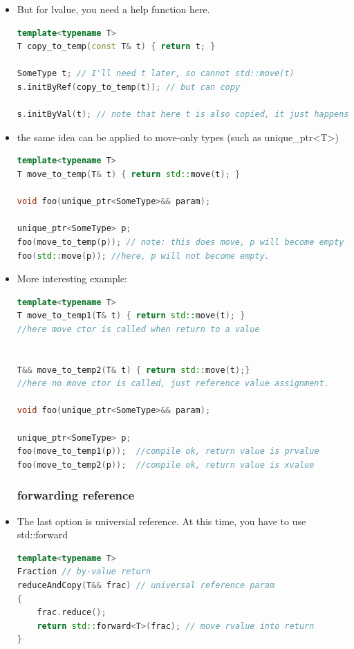 \documentclass[a4paper,11pt,twoside]{book}
\begin{document}
\begin{itemize}
\item But for lvalue, you need a help function here.
\begin{lstlisting}[frame=single, language=c++]
template<typename T>
T copy_to_temp(const T& t) { return t; }

SomeType t; // I'll need t later, so cannot std::move(t)
s.initByRef(copy_to_temp(t)); // but can copy

s.initByVal(t); // note that here t is also copied, it just happens implicitly
\end{lstlisting}

\item the same idea can be applied to move-only types (such as unique\_ptr<T>)
\begin{lstlisting}[frame=single, language=c++]
template<typename T>
T move_to_temp(T& t) { return std::move(t); }

void foo(unique_ptr<SomeType>&& param);

unique_ptr<SomeType> p;
foo(move_to_temp(p)); // note: this does move, p will become empty
foo(std::move(p)); //here, p will not become empty. 
\end{lstlisting}


\item More interesting example:
\begin{lstlisting}[frame=single, language=c++]
template<typename T>
T move_to_temp1(T& t) { return std::move(t); }
//here move ctor is called when return to a value


T&& move_to_temp2(T& t) { return std::move(t);}
//here no move ctor is called, just reference value assignment.

void foo(unique_ptr<SomeType>&& param);

unique_ptr<SomeType> p;
foo(move_to_temp1(p));  //compile ok, return value is prvalue
foo(move_to_temp2(p));  //compile ok, return value is xvalue
\end{lstlisting}


\subsubsection{forwarding reference}

\item The last option is universial reference. At this time, you have to use std::forward 
\begin{lstlisting}[frame=single, language=c++]
template<typename T>
Fraction // by-value return
reduceAndCopy(T&& frac) // universal reference param
{
	frac.reduce();
	return std::forward<T>(frac); // move rvalue into return
} 
\end{lstlisting}

\end{itemize}
\end{document}
